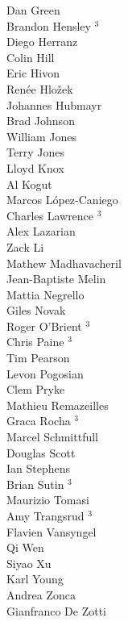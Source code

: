 \documentclass[PICOReport.tex]{subfiles}
\begin{document}
{{\begin{multicols}{4}
Dan Green                       \\
Brandon Hensley $^3$                \\
Diego Herranz                   \\
Colin Hill                      \\
Eric Hivon                      \\
Ren\'{e}e  Hlo\v{z}ek           \\
Johannes Hubmayr                \\
Brad Johnson                    \\
William Jones                   \\
Terry Jones                     \\
Lloyd Knox                      \\
Al Kogut                        \\
Marcos L\'{o}pez-Caniego        \\
Charles Lawrence  $^3$              \\
Alex Lazarian                   \\
Zack Li                         \\
Mathew Madhavacheril            \\
Jean-Baptiste Melin             \\
Mattia Negrello                 \\
Giles Novak                     \\
Roger O'Brient $^3$                 \\
Chris Paine $^3$                    \\
Tim Pearson                     \\
Levon Pogosian                  \\
Clem Pryke                      \\
Mathieu Remazeilles             \\
Graca Rocha $^3$                    \\
Marcel Schmittfull              \\
Douglas Scott                   \\
Ian Stephens                    \\
Brian Sutin $^3$                    \\
Maurizio Tomasi                 \\
Amy Trangsrud $^3$                  \\
Flavien Vansyngel               \\
Qi Wen                          \\
Siyao Xu                        \\
Karl Young                      \\
Andrea Zonca                    \\
Gianfranco De Zotti             
\end{multicols}
}

}
\end{document}

